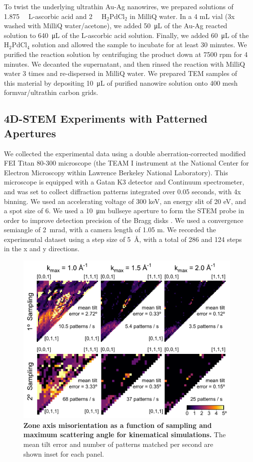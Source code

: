 \documentclass[%
 superscriptaddress,
 aip,
 amsmath,amssymb,
reprint,%
 author-year,%
longbibliography
]{revtex4-2}
\begin{document}
To twist the underlying ultrathin Au-Ag nanowires, we prepared solutions of \SI{1.875}{\milli\Molar} L-ascorbic acid and \SI{2}{\milli\Molar} H$_{2}$PdCl$_{2}$ in MilliQ water. In a 4 mL vial (3x washed with MilliQ water/acetone), we added \SI{50}{\micro\liter} of the Au-Ag reacted solution to \SI{640}{\micro\liter} of the L-ascorbic acid solution. Finally, we added \SI{60}{\micro\liter} of the H$_{2}$PdCl$_{4}$ solution and allowed the sample to incubate for at least 30 minutes. We purified the reaction solution by centrifuging the product down at 7500 rpm for 4 minutes. We decanted the supernatant, and then rinsed the reaction with MilliQ water 3 times and re-dispersed in MilliQ water. We prepared TEM samples of this material by depositing \SI{10}{\micro\liter} of purified nanowire solution onto 400 mesh formvar/ultrathin carbon grids.





\subsection*{4D-STEM Experiments with Patterned Apertures}

We collected the experimental data using a double aberration-corrected modified FEI Titan 80-300 microscope (the TEAM I instrument at the National Center for Electron Microscopy within Lawrence Berkeley  National Laboratory). This microscope is equipped with a Gatan K3 detector and Continuum spectrometer, and was set to collect diffraction patterns integrated over 0.05 seconds, with 4x binning. We used an accelerating voltage of 300 keV, an energy slit of 20 eV, and a spot size of 6. We used a \SI{10}{\micro\meter} bullseye aperture to form the STEM probe in order to improve detection precision of the Bragg disks \citep{zeltmann2020}. We used a convergence semiangle of \SI{2}{\milli\radian}, with a camera length of 1.05 m. We recorded the experimental dataset using a step size of \SI{5}{\angstrom}, with a total of 286 and 124 steps in the x and y directions.



\begin{figure}[htbp]
    \centering
    \includegraphics[width=3.2 in]{figure_ACOM_Au_error_v03.pdf}
    \caption{{\bf Zone axis misorientation as a function of sampling and maximum scattering angle for kinematical simulations.} The mean tilt error and number of patterns matched per second are shown inset for each panel.}
    \label{Fig:ACOM_kinematical}
\end{figure}
\end{document}
